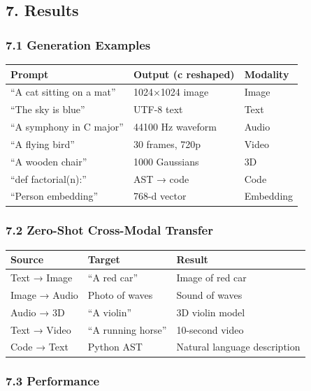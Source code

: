 \documentclass[
  11pt,
  a4paper,
]{article}
\begin{document}
\subsection{7. Results}\label{results}

\subsubsection{7.1 Generation Examples}\label{generation-examples}

\begin{longtable}[]{@{}lll@{}}
\toprule\noalign{}
Prompt & Output (c reshaped) & Modality \\
\midrule\noalign{}
\endhead
\bottomrule\noalign{}
\endlastfoot
``A cat sitting on a mat'' & 1024×1024 image & Image \\
``The sky is blue'' & UTF-8 text & Text \\
``A symphony in C major'' & 44100 Hz waveform & Audio \\
``A flying bird'' & 30 frames, 720p & Video \\
``A wooden chair'' & 1000 Gaussians & 3D \\
``def factorial(n):'' & AST → code & Code \\
``Person embedding'' & 768-d vector & Embedding \\
\end{longtable}

\subsubsection{7.2 Zero-Shot Cross-Modal
Transfer}\label{zero-shot-cross-modal-transfer-1}

\begin{longtable}[]{@{}lll@{}}
\toprule\noalign{}
Source & Target & Result \\
\midrule\noalign{}
\endhead
\bottomrule\noalign{}
\endlastfoot
Text → Image & ``A red car'' & Image of red car \\
Image → Audio & Photo of waves & Sound of waves \\
Audio → 3D & ``A violin'' & 3D violin model \\
Text → Video & ``A running horse'' & 10-second video \\
Code → Text & Python AST & Natural language description \\
\end{longtable}

\subsubsection{7.3 Performance}\label{performance}
\end{document}
